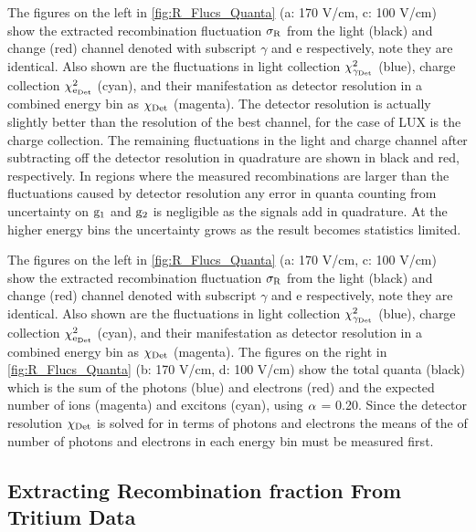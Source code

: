 The figures on the left in \ref{fig:R_Flucs_Quanta} (a: 170 V/cm, c: 100 V/cm)  show the extracted recombination fluctuation $\rm \sigma_R$ from the light (black) and change (red) channel denoted with subscript $\gamma$ and e respectively, note they are identical. Also shown are the fluctuations in light collection $\rm \chi_{\gamma_{Det}}^2$ (blue), charge collection $\rm \chi_{e_{Det}}^2$ (cyan), and their manifestation as detector resolution in a combined energy bin as $\rm \chi_{Det}$ (magenta). The detector resolution is actually slightly better than the resolution of the best channel, for the case of LUX is the charge collection. The remaining fluctuations in the light and charge channel after subtracting off the detector resolution in quadrature are shown in black and red, respectively. In regions where the measured recombinations are larger than the fluctuations caused by detector resolution any error in quanta counting from uncertainty on $\rm g_1$ and $\rm g_2$ is negligible as the signals add in quadrature. At the higher energy bins the uncertainty grows as the result becomes statistics limited. 

The figures on the left in \ref{fig:R_Flucs_Quanta} (a: 170 V/cm, c: 100 V/cm) show the extracted recombination fluctuation $\rm \sigma_R$ from the light (black) and change (red) channel denoted with subscript $\gamma$ and e respectively, note they are identical. Also shown are the fluctuations in light collection $\rm \chi_{\gamma_{Det}}^2$ (blue), charge collection $\rm \chi_{e_{Det}}^2$ (cyan), and their manifestation as detector resolution in a combined energy bin as $\rm \chi_{Det}$ (magenta).  The figures on the right in \ref{fig:R_Flucs_Quanta} (b: 170 V/cm, d: 100 V/cm) show the total quanta (black) which is the sum of the photons (blue) and electrons (red) and the expected number of ions (magenta) and excitons (cyan), using $\rm \alpha$ = 0.20. Since the detector resolution $\rm \chi_{Det}$ is solved for in terms of photons and electrons the means of the of number of photons and electrons in each energy bin must be measured first.


\subsection{Extracting Recombination fraction From Tritium Data}

